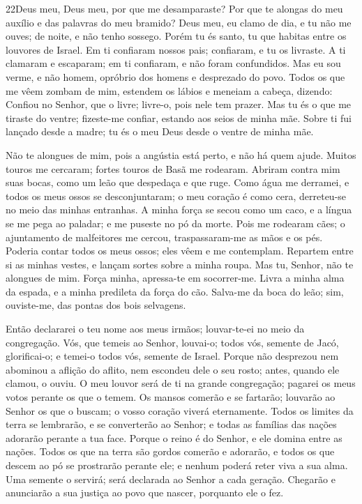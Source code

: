 \bigskip

\lettrine{22}{}Deus meu, Deus meu, por que me desamparaste? Por
que te alongas do meu auxílio e das palavras do meu bramido?
Deus meu, eu clamo de dia, e tu não me ouves; de noite, e não
tenho sossego. Porém tu és santo, tu que habitas entre os
louvores de Israel. Em ti confiaram nossos pais; confiaram, e tu
os livraste. A ti clamaram e escaparam; em ti confiaram, e não
foram confundidos. Mas eu sou verme, e não homem, opróbrio dos
homens e desprezado do povo. Todos os que me vêem zombam de mim,
estendem os lábios e meneiam a cabeça, dizendo: Confiou no
Senhor, que o livre; livre-o, pois nele tem prazer. Mas tu és o
que me tiraste do ventre; fizeste-me confiar, estando aos seios de
minha mãe. Sobre ti fui lançado desde a madre; tu és o meu
Deus desde o ventre de minha mãe.

Não te alongues de mim, pois a angústia está perto, e não há quem
ajude. Muitos touros me cercaram; fortes touros de Basã me
rodearam. Abriram contra mim suas bocas, como um leão que
despedaça e que ruge. Como água me derramei, e todos os meus
ossos se desconjuntaram; o meu coração é como cera, derreteu-se no
meio das minhas entranhas. A minha força se secou como um
caco, e a língua se me pega ao paladar; e me puseste no pó da morte.
Pois me rodearam cães; o ajuntamento de malfeitores me
cercou, traspassaram-me as mãos e os pés. Poderia contar
todos os meus ossos; eles vêem e me contemplam. Repartem
entre si as minhas vestes, e lançam sortes sobre a minha roupa.
Mas tu, Senhor, não te alongues de mim. Força minha,
apressa-te em socorrer-me. Livra a minha alma da espada, e a
minha predileta da força do cão. Salva-me da boca do leão;
sim, ouviste-me, das pontas dos bois selvagens.

Então declararei o teu nome aos meus irmãos; louvar-te-ei no meio
da congregação. Vós, que temeis ao Senhor, louvai-o; todos
vós, semente de Jacó, glorificai-o; e temei-o todos vós, semente de
Israel. Porque não desprezou nem abominou a aflição do
aflito, nem escondeu dele o seu rosto; antes, quando ele clamou, o
ouviu. O meu louvor será de ti na grande congregação; pagarei
os meus votos perante os que o temem. Os mansos comerão e se
fartarão; louvarão ao Senhor os que o buscam; o vosso coração viverá
eternamente. Todos os limites da terra se lembrarão, e se
converterão ao Senhor; e todas as famílias das nações adorarão
perante a tua face. Porque o reino é do Senhor, e ele domina
entre as nações. Todos os que na terra são gordos comerão e
adorarão, e todos os que descem ao pó se prostrarão perante ele; e
nenhum poderá reter viva a sua alma. Uma semente o servirá;
será declarada ao Senhor a cada geração. Chegarão e
anunciarão a sua justiça ao povo que nascer, porquanto ele o fez.

